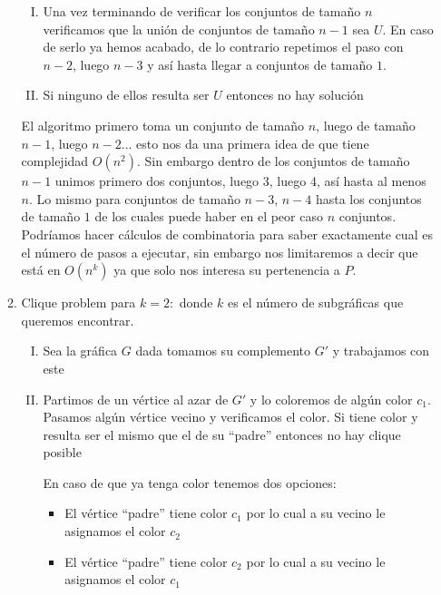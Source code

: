 \documentclass[12pt,letterpaper]{article}
\begin{document}
\begin{itemize}
\begin{enumerate}
\begin{enumerate}[I.]
    \item Una vez terminando de verificar los conjuntos de tamaño $n$ verificamos que la unión de conjuntos de tamaño $n-1$ sea $U$. En caso de serlo ya hemos acabado, de lo contrario repetimos el paso con $n-2$, luego $n-3$ y así hasta llegar a conjuntos de tamaño $1$.
 
    \item Si ninguno de ellos resulta ser $U$ entonces no hay solución
 \end{enumerate}
    El algoritmo primero toma un conjunto de tamaño $n$, luego de tamaño $n-1$, luego $n-2$... esto nos da una primera idea de que tiene complejidad $O(n^2)$. Sin embargo dentro de los conjuntos de tamaño $n-1$ unimos primero dos conjuntos, luego 3, luego 4, así hasta al menos $n$. Lo mismo para conjuntos de tamaño $n-3$, $n-4$ hasta los conjuntos de tamaño $1$ de los cuales puede haber en el peor caso $n$ conjuntos. Podríamos hacer cálculos de combinatoria para saber exactamente cual es el número de pasos a ejecutar, sin embargo nos limitaremos a decir que está en $O(n^k)$ ya que solo nos interesa su pertenencia a $P$.\\
   
    \item Clique problem para $k=2:$ donde $k$ es el número de subgráficas que queremos encontrar.
    \begin{enumerate}[I.]
        \item Sea la gráfica $G$ dada tomamos su complemento $G'$ y trabajamos con este
        
        \item Partimos de un vértice al azar de $G'$ y lo coloremos de algún color $c_1$. Pasamos algún vértice vecino y verificamos el color.
        Si tiene color y resulta ser el mismo que el de su ``padre'' entonces no hay clique posible
        
        En caso de que ya tenga color tenemos dos opciones:
        \begin{itemize}
            \item El vértice ``padre'' tiene color $c_1$ por lo cual a su vecino le asignamos el color $c_2$
            
            \item El vértice ``padre'' tiene color $c_2$ por lo cual a su vecino le asignamos el color $c_1$
        \end{itemize}
        

\end{enumerate}
\end{enumerate}
\end{itemize}
\end{document}
